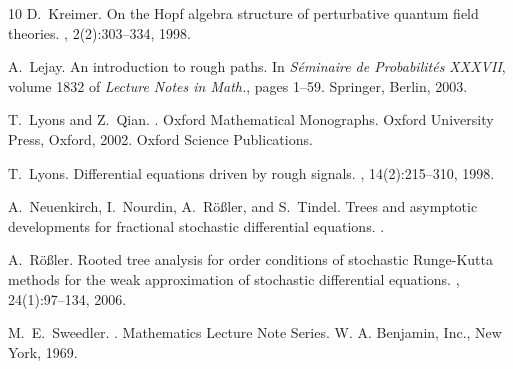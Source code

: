 \documentclass[a4paper,11pt,reqno]{article}
\newcommand{\1}{{\bf 1}}
\begin{document}
\begin{thebibliography}{10}
D.~Kreimer.
\newblock On the {H}opf algebra structure of perturbative quantum field
  theories.
, 2(2):303--334, 1998.

A.~Lejay.
\newblock An introduction to rough paths.
\newblock In {\em S\'eminaire de Probabilit\'es XXXVII}, volume 1832 of {\em
  Lecture Notes in Math.}, pages 1--59. Springer, Berlin, 2003.

T.~Lyons and Z.~Qian.
.
\newblock Oxford Mathematical Monographs. Oxford University Press, Oxford,
  2002.
\newblock Oxford Science Publications.

T.~Lyons.
\newblock Differential equations driven by rough signals.
, 14(2):215--310, 1998.

A.~Neuenkirch, I.~Nourdin, A.~R\"o{\ss}ler, and S.~Tindel.
\newblock Trees and asymptotic developments for fractional stochastic
  differential equations.
.

A.~R{\"o}{\ss}ler.
\newblock Rooted tree analysis for order conditions of stochastic
  {R}unge-{K}utta methods for the weak approximation of stochastic differential
  equations.
, 24(1):97--134, 2006.

M.~E.~Sweedler.
.
\newblock Mathematics Lecture Note Series. W. A. Benjamin, Inc., New York,
  1969.

\end{thebibliography}
\end{document}
